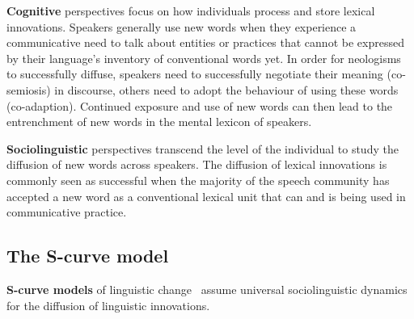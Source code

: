 \documentclass[a4paper, abstract=on]{scrartcl}
\renewcommand{\hw}[1]{\textbf{#1}}
\begin{document}
    \hw{Cognitive} perspectives focus on how individuals process and store lexical innovations. Speakers generally use new words when they experience a communicative need to talk about entities or practices that cannot be expressed by their language's inventory of conventional words yet. In order for neologisms to successfully diffuse, speakers need to successfully negotiate their meaning (co-semiosis) in discourse, others need to adopt the behaviour of using these words (co-adaption). Continued exposure and use of new words can then lead to the entrenchment of new words in the mental lexicon of speakers.~\parencite{Schmid2008}

    \hw{Sociolinguistic} perspectives transcend the level of the individual to study the diffusion of new words across speakers. The diffusion of lexical innovations is commonly seen as successful when the majority of the speech community has accepted a new word as a conventional lexical unit that can and is being used in communicative practice.

  \subsection{The S-curve model}

    \hw{S-curve models} of linguistic change~\parencite{Labov2007,Milroy1992,Nevalainen2015} assume universal sociolinguistic dynamics for the diffusion of linguistic innovations.
\end{document}
